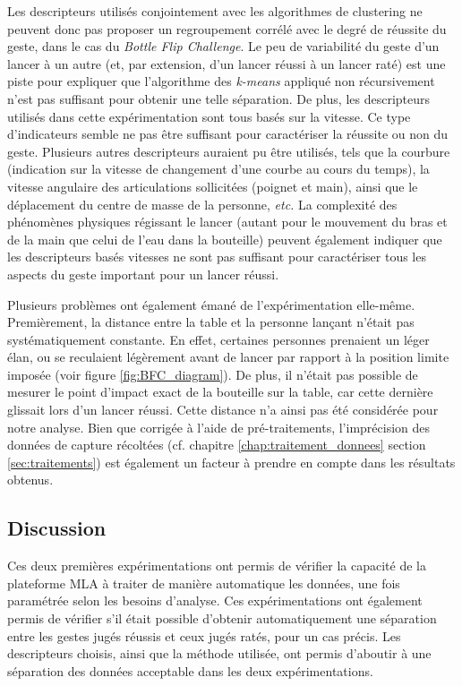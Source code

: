 Les descripteurs utilisés conjointement avec les algorithmes de clustering ne peuvent donc pas proposer un regroupement corrélé avec le degré de réussite du geste, dans le cas du \textit{Bottle Flip Challenge}. Le peu de variabilité du geste d'un lancer à un autre (et, par extension, d'un lancer réussi à un lancer raté) est une piste pour expliquer que l'algorithme des \textit{k-means} appliqué non récursivement n'est pas suffisant pour obtenir une telle séparation. De plus, les descripteurs utilisés dans cette expérimentation sont tous basés sur la vitesse. Ce type d'indicateurs semble ne pas être suffisant pour caractériser la réussite ou non du geste. Plusieurs autres descripteurs auraient pu être utilisés, tels que la courbure (indication sur la vitesse de changement d'une courbe au cours du temps), la vitesse angulaire des articulations sollicitées (poignet et main), ainsi que le déplacement du centre de masse de la personne, \textit{etc.} La complexité des phénomènes physiques régissant le lancer (autant pour le mouvement du bras et de la main que celui de l'eau dans la bouteille) peuvent également indiquer que les descripteurs basés vitesses ne sont pas suffisant pour caractériser tous les aspects du geste important pour un lancer réussi.

Plusieurs problèmes ont également émané de l'expérimentation elle-même. Premièrement, la distance entre la table et la personne lançant n'était pas systématiquement constante. En effet, certaines personnes prenaient un léger élan, ou se reculaient légèrement avant de lancer par rapport à la position limite imposée (voir figure \ref{fig:BFC_diagram}). De plus, il n'était pas possible de mesurer le point d'impact exact de la bouteille sur la table, car cette dernière glissait lors d'un lancer réussi. Cette distance n'a ainsi pas été considérée pour notre analyse. Bien que corrigée à l'aide de pré-traitements, l'imprécision des données de capture récoltées (cf. chapitre \ref{chap:traitement_donnees} section \ref{sec:traitements}) est également un facteur à prendre en compte dans les résultats obtenus.

\subsection{Discussion}
Ces deux premières expérimentations ont permis de vérifier la capacité de la plateforme MLA à traiter de manière automatique les données, une fois paramétrée selon les besoins d'analyse. Ces expérimentations ont également permis de vérifier s'il était possible d'obtenir automatiquement une séparation entre les gestes jugés réussis et ceux jugés ratés, pour un cas précis. Les descripteurs choisis, ainsi que la méthode utilisée, ont permis d'aboutir à une séparation des données acceptable dans les deux expérimentations.

